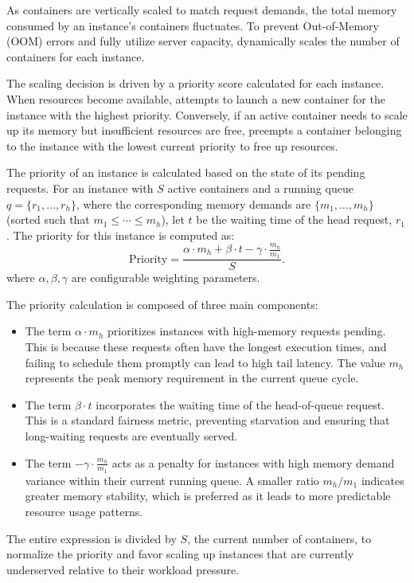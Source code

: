 As containers are vertically scaled to match request demands, the total memory consumed by an instance's containers fluctuates. To prevent Out-of-Memory (OOM) errors and fully utilize server capacity, \sysname dynamically scales the number of containers for each instance.

The scaling decision is driven by a priority score calculated for each instance. When resources become available, \sysname attempts to launch a new container for the instance with the highest priority.
Conversely, if an active container needs to scale up its memory but insufficient resources are free, \sysname preempts a container belonging to the instance with the lowest current priority to free up resources.

The priority of an instance is calculated based on the state of its pending requests. For an instance with $S$ active containers and a running queue $q=\{r_1, \dots, r_h\}$, where the corresponding memory demands are $\{m_1, \dots, m_h\}$ (sorted such that $m_1 \le \cdots \le m_h$), let $t$ be the waiting time of the head request, $r_1$. The priority for this instance is computed as:
\begin{equation}
    \text{Priority}=\frac{\alpha\cdot m_h + \beta\cdot t - \gamma\cdot \frac{m_h}{m_1}}{S}.
\end{equation}
\noindent where $\alpha, \beta, \gamma$ are configurable weighting parameters.

The priority calculation is composed of three main components:
\begin{itemize}
    \item The term $\alpha \cdot m_h$ prioritizes instances with high-memory requests pending. This is because these requests often have the longest execution times, and failing to schedule them promptly can lead to high tail latency. The value $m_h$ represents the peak memory requirement in the current queue cycle.
    \item The term $\beta \cdot t$ incorporates the waiting time of the head-of-queue request. This is a standard fairness metric, preventing starvation and ensuring that long-waiting requests are eventually served.
    \item The term $-\gamma \cdot \frac{m_h}{m_1}$ acts as a penalty for instances with high memory demand variance within their current running queue. A smaller ratio $m_h/m_1$ indicates greater memory stability, which is preferred as it leads to more predictable resource usage patterns.
\end{itemize}
The entire expression is divided by $S$, the current number of containers, to normalize the priority and favor scaling up instances that are currently underserved relative to their workload pressure.
